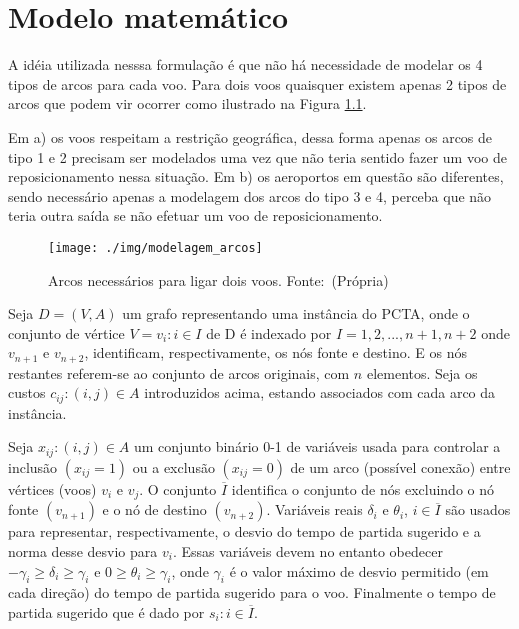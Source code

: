   \chapter{Modelo matemático}\label{cap:modelomat}
  
A idéia utilizada nesssa formulação é que não há necessidade de
modelar os 4 tipos de arcos para cada voo. Para dois voos quaisquer existem
apenas 2 tipos de arcos que podem vir ocorrer como ilustrado na Figura
\ref{fig:modelagem_arcos}.

Em a) os voos respeitam a restrição geográfica, dessa forma apenas os arcos de
tipo 1 e 2 precisam ser modelados uma vez que não teria sentido fazer um voo de
reposicionamento nessa situação. Em b) os aeroportos em questão são diferentes,
sendo necessário apenas a modelagem dos arcos do tipo 3 e 4, perceba que não
teria outra saída se não efetuar um voo de reposicionamento.

\begin{figure}[ht]
	\centering
	\caption{Arcos necessários para ligar dois voos. \mbox{Fonte:
	(Própria)}}\label{fig:modelagem_arcos}
	\texttt{[image: ./img/modelagem\_arcos]}
\end{figure}

Seja $D = (V,A)$ um grafo representando uma instância do PCTA, onde o conjunto de vértice $V = {v_{i}:i \in I}$ de D é indexado por $I = {1, 2, ..., n+1, n+2}$ onde $v_{n+1}$ e $v_{n+2}$, identificam, respectivamente, os nós fonte e destino. E os nós restantes referem-se ao conjunto de arcos originais, com $n$ elementos. Seja os custos ${c_{ij}:(i,j) \in A}$ introduzidos acima, estando associados com cada arco da instância.
  
Seja ${x_{ij}:(i,j) \in A}$ um conjunto binário 0-1 de variáveis usada para controlar a inclusão $(x_{ij} = 1)$ ou a exclusão $(x_{ij} = 0)$ de um arco (possível conexão) entre vértices (voos) $v_{i}$ e $v_{j}$. O conjunto $\overline{I}$ identifica o conjunto de nós excluindo o nó fonte $(v_{n+1})$ e o nó de destino $(v_{n+2})$. Variáveis reais $\delta_{i}$ e $\theta_{i}$, $i \in \overline{I}$ são usados para representar, respectivamente, o desvio do tempo de partida sugerido e a norma desse desvio para $v_{i}$. Essas variáveis devem no entanto obedecer $-\gamma_{i} \geq \delta_{i} \geq \gamma_{i}$ e $0 \geq \theta_{i} \geq \gamma_{i}$, onde $\gamma_{i}$ é o valor máximo de desvio permitido (em cada direção) do tempo de partida sugerido para o voo. Finalmente o tempo de partida sugerido que é dado por $s_{i}:i \in \overline{I}$.
  
